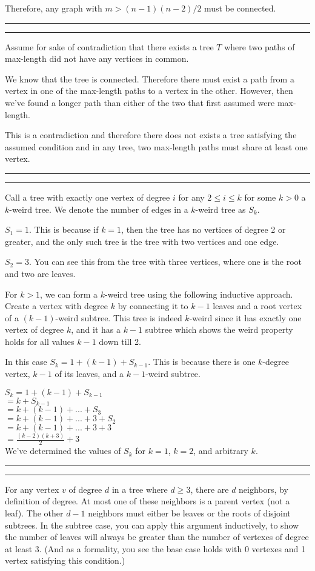 \documentclass[11pt,letterpaper]{article}
\newcommand{\question}[1] {\vspace{.25in} \hrule\vspace{0.5em}
\noindent{\bf #1} \vspace{0.5em}
\hrule \vspace{.10in}}
\begin{document}
Therefore, any graph with $m > (n-1)(n-2)/2$ must be connected.

\question{4}
Assume for sake of contradiction that there exists a tree $T$ where two paths of max-length did not have any vertices in common.

We know that the tree is connected.
Therefore there must exist a path from a vertex in one of the max-length paths to a vertex in the other.
However, then we've found a longer path than either of the two that first assumed were max-length.

This is a contradiction and therefore there does not exists a tree satisfying the assumed condition and in any tree, two max-length paths must share at least one vertex.

\question{5}
Call a tree with exactly one vertex of degree $i$ for any $2 \leq i \leq k$ for some $k > 0$ a $k$-weird tree.
We denote the number of edges in a $k$-weird tree as $S_k$.

$S_1 = 1$. This is because if $k=1$, then the tree has no vertices of degree 2 or greater, and the only such tree is the tree with two vertices and one edge.

$S_2 = 3$. You can see this from the tree with three vertices, where one is the root and two are leaves.

For $k>1$, we can form a $k$-weird tree using the following inductive approach. Create a vertex with degree $k$ by connecting it to $k-1$ leaves and a root vertex of a $(k-1)$-weird subtree.
This tree is indeed $k$-weird since it has exactly one vertex of degree $k$, and it has a $k-1$ subtree which shows the weird property holds for all values $k-1$ down till 2.

In this case $S_k = 1 + (k-1) + S_{k-1}$. This is because there is one $k$-degree vertex, $k-1$ of its leaves, and a $k-1$-weird subtree.

$S_k = 1 + (k-1) + S_{k-1}$\\
$    = k + S_{k-1}$\\
$    = k + (k-1) + ... + S_3$\\
$    = k + (k-1) + ... + 3 + S_2$\\
$    = k + (k-1) + ... + 3 + 3$\\
$    = \frac{(k-2)(k+3)}{2} + 3$\\

We've determined the values of $S_k$ for $k=1$, $k=2$, and arbitrary $k$.

\question{6}
For any vertex $v$ of degree $d$ in a tree where $d \geq 3$, there are $d$ neighbors, by definition of degree.
At most one of these neighbors is a parent vertex (not a leaf). The other $d-1$ neighbors must either be leaves or the roots of disjoint subtrees.
In the subtree case, you can apply this argument inductively, to show the number of leaves will always be greater than the number of vertexes of degree at least 3.
(And as a formality, you see the base case holds with 0 vertexes and 1 vertex satisfying this condition.)
\end{document}
